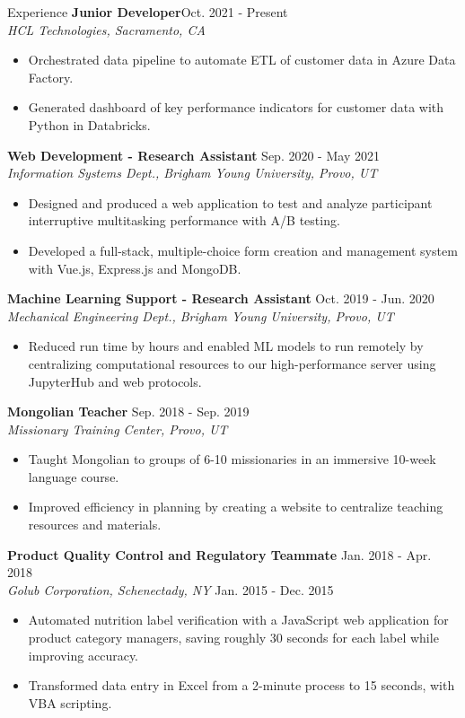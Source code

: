 \documentclass{resume} %
\begin{document}
\begin{rSection}{Experience}
    \textbf{Junior Developer}\hfill{Oct. 2021 - Present}\\
    \textit{HCL Technologies, Sacramento, CA} 
    \begin{itemize}
        \item Orchestrated data pipeline to automate ETL of customer data in Azure Data Factory.
        \item Generated dashboard of key performance indicators for customer data with Python in
            Databricks.
    \end{itemize}
    \textbf{Web Development - Research Assistant}\hfill{ Sep.  2020 - May 2021}\\
    \textit{Information Systems Dept., Brigham Young University, Provo, UT} 
    \begin{itemize}
        \item Designed and produced a web application to test and analyze participant interruptive
            multitasking performance with A/B testing.
        \item Developed a full-stack, multiple-choice form creation and management system with
            Vue.js, Express.js and MongoDB.
    \end{itemize}
\textbf{Machine Learning Support - Research Assistant} \hfill{Oct. 2019
- Jun. 2020}\\
\textit{Mechanical Engineering Dept., Brigham Young University, Provo, UT}
    \begin{itemize}
        \item Reduced run time by hours and enabled ML models to run remotely by centralizing
            computational resources to our high-performance server using JupyterHub and web
            protocols.
    \end{itemize}
\textbf{Mongolian Teacher} \hfill {Sep. 2018 - Sep. 2019}\\
\textit{Missionary Training Center, Provo, UT} 
    \begin{itemize}
        \item Taught Mongolian to groups of 6-10 missionaries in an immersive 10-week language
            course.
        \item Improved efficiency in planning by creating a website to centralize teaching
            resources and materials.
    \end{itemize}
\textbf{Product Quality Control and Regulatory Teammate}    \hfill {Jan. 2018 -
Apr. 2018}\\
\textit{Golub Corporation, Schenectady, NY}                 \hfill {Jan. 2015 -
Dec. 2015}  
    \begin{itemize}
        \item Automated nutrition label verification with a JavaScript web application for product
            category managers, saving roughly 30 seconds for each label while improving accuracy.
        \item Transformed data entry in Excel from a 2-minute process to 15 seconds, with
            VBA scripting.
    \end{itemize}
\end{rSection}
\end{document}
